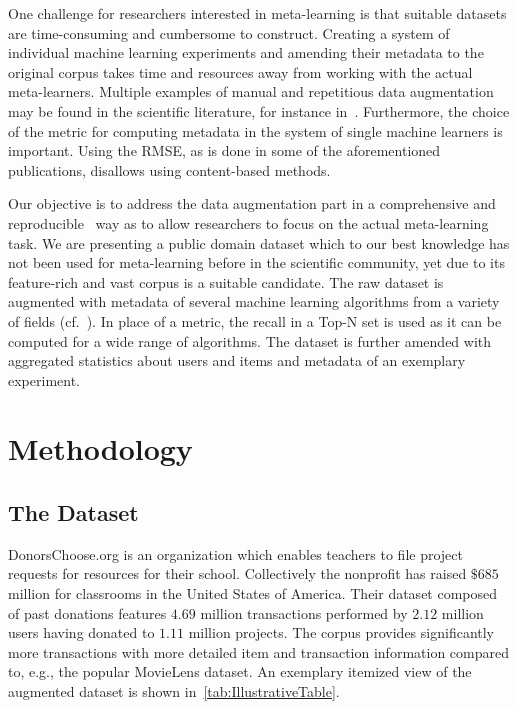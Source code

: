 \documentclass[runningheads]{llncs}
\begin{document}
One challenge for researchers interested in meta-learning is that suitable datasets are time-consuming and cumbersome to construct. Creating a system of individual machine learning experiments and amending their metadata to the original corpus takes time and resources away from working with the actual meta-learners. Multiple examples of manual and repetitious data augmentation may be found in the scientific literature, for instance in~\cite{CUNHA2018128,DBLP:journals/corr/abs-1805-12118,Ekstrand:2012:RFP:2365952.2366002}. Furthermore, the choice of the metric for computing metadata in the system of single machine learners is important. Using the RMSE, as is done in some of the aforementioned publications, disallows using content-based methods.

Our objective is to address the data augmentation part in a comprehensive and reproducible~\cite{UMUAI:TowardsReproducibilityInRecSysBeel2016} way as to allow researchers to focus on the actual meta-learning task. We are presenting a public domain dataset which to our best knowledge has not been used for meta-learning before in the scientific community, yet due to its feature-rich and vast corpus is a suitable candidate. The raw dataset is augmented with metadata of several machine learning algorithms from a variety of fields (cf.~\cite{DBLP:journals/corr/abs-1805-12118}). In place of a metric, the recall in a Top-N set is used as it can be computed for a wide range of algorithms. The dataset is further amended with aggregated statistics about users and items and metadata of an exemplary experiment.

\section{Methodology}

\subsection{The Dataset}
DonorsChoose.org is an organization which enables teachers to file project requests for resources for their school. Collectively the nonprofit has raised $\$685$ million for classrooms in the United States of America. Their dataset composed of past donations features $4.69$ million transactions performed by $2.12$ million users having donated to $1.11$ million projects. The corpus provides significantly more transactions with more detailed item and transaction information compared to, e.g., the popular MovieLens dataset. An exemplary itemized view of the augmented dataset is shown in~\autoref{tab:IllustrativeTable}.
\end{document}
